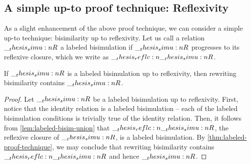 \subsection{A simple up-to proof technique: Reflexivity}

As a slight enhancement of the above proof technique, we can consider a simple up-to technique: bisimilarity up to reflexivity.
Let us call a relation $\__thesis_simu:n {R}$ a labeled bisimulation  if $\__thesis_simu:n {R}$ progresses to its reflexive closure, which we write as $\reflc{\simu{R}}$.
%
%
%
\begin{theorem}\label{thm:bisim-technique-up-to-refl}
  If $\__thesis_simu:n {R}$ is a labeled bisimulation up to reflexivity, then rewriting bisimilarity contains $\__thesis_simu:n {R}$.
\end{theorem}
\begin{proof}
  Let $\__thesis_simu:n {R}$ be a labeled bisimulation up to reflexivity.
  First, notice that the identity relation is a labeled bisimulation -- each of the labeled bisimulation conditions is trivially true of the identity relation.
  Then, it follows from \cref{lem:labeled-bisim-union} that $\reflc{\simu{R}}$, the reflexive closure of $\__thesis_simu:n {R}$, is a labeled bisimulation.
  By \cref{thm:labeled-proof-technique}, we may conclude that rewriting bisimilarity contains $\reflc{\simu{R}}$ and hence $\__thesis_simu:n {R}$.
\end{proof}


